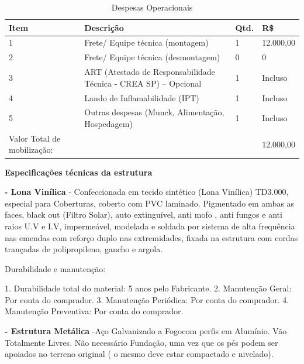 \begin{table}[h]
\centering
\caption{Despesas Operacionais}
\label{DespesasOperacionais}
\begin{tabular}{|l|l|l|l|}
\hline
Item                        & Descrição                                                       & Qtd. & R\$       \\ \hline
1                           & Frete/ Equipe técnica (montagem)                                & 1    & 12.000,00 \\ \hline
2                           & Frete/ Equipe técnica (desmontagem)                             & 0    & 0         \\ \hline
3                           & ART (Atestado de Responsabilidade Técnica - CREA SP) – Opcional & 1    & Incluso   \\ \hline
4                           & Laudo de Inflamabilidade (IPT)                                  & 1    & Incluso   \\ \hline
5                           & Outras despesas (Munck, Alimentação, Hospedagem)                & 1    & Incluso   \\ \hline
Valor Total de mobilização: &                                                                 &      & 12.000,00 \\ \hline
\end{tabular}
\end{table}

\textbf{Especificações técnicas da estrutura}

\textbf{- Lona Vinílica} - Confeccionada em tecido sintético (Lona Vinílica) TD3.000, especial para Coberturas, coberto com PVC laminado. Pigmentado em ambas as faces, black out (Filtro Solar), auto extinguível, anti mofo , anti fungos e anti raios U.V e I.V, impermeável, modelada e soldada por sistema de alta frequência nas emendas com reforço duplo nas extremidades, fixada na estrutura com cordas trançadas de polipropileno, gancho e argola.

Durabilidade e manutenção:

1. Durabilidade total do material: 5 anos pelo Fabricante.
2. Manutenção Geral: Por conta do comprador.
3. Manutenção Periódica: Por conta do comprador.
4. Manutenção Preventiva: Por conta do comprador.

\textbf{- Estrutura Metálica} -Aço Galvanizado a Fogocom perfis em Alumínio. Vão Totalmente Livres. Não necessário Fundação, uma vez que os pés podem ser apoiados no terreno original ( o mesmo deve estar compactado e nivelado).

